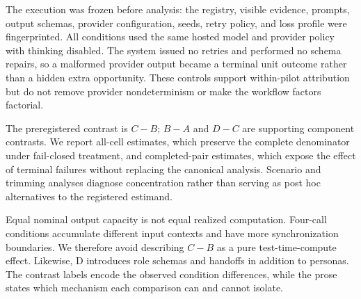 The execution was frozen before analysis: the registry, visible evidence,
prompts, output schemas, provider configuration, seeds, retry policy, and loss
profile were fingerprinted.  All conditions used the same hosted model and
provider policy with thinking disabled.  The system issued no retries and
performed no schema repairs, so a malformed provider output became a terminal
unit outcome rather than a hidden extra opportunity.  These controls support
within-pilot attribution but do not remove provider nondeterminism or make the
workflow factors factorial.

The preregistered contrast is \(C-B\); \(B-A\) and \(D-C\) are supporting
component contrasts.  We report all-cell estimates, which preserve the
complete denominator under fail-closed treatment, and completed-pair
estimates, which expose the effect of terminal failures without replacing the
canonical analysis.  Scenario and trimming analyses diagnose concentration
rather than serving as post hoc alternatives to the registered estimand.

Equal nominal output capacity is not equal realized computation.  Four-call
conditions accumulate different input contexts and have more synchronization
boundaries.  We therefore avoid describing \(C-B\) as a pure
test-time-compute effect.  Likewise, D introduces role schemas and handoffs in
addition to personas.  The contrast labels encode the observed condition
differences, while the prose states which mechanism each comparison can and
cannot isolate.

